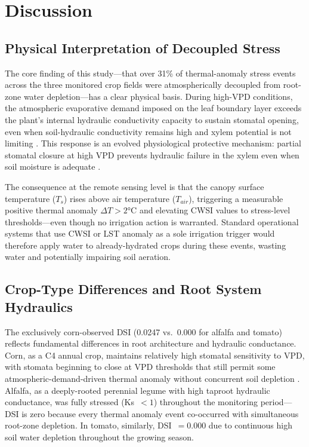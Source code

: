 \documentclass[review,12pt]{elsarticle}
\begin{document}
\section{Discussion}
\label{sec:discussion}

\subsection{Physical Interpretation of Decoupled Stress}
\label{subsec:physical_discussion}

The core finding of this study---that over 31\% of thermal-anomaly stress events across the three monitored crop fields were atmospherically decoupled from root-zone water depletion---has a clear physical basis. During high-VPD conditions, the atmospheric evaporative demand imposed on the leaf boundary layer exceeds the plant's internal hydraulic conductivity capacity to sustain stomatal opening, even when soil-hydraulic conductivity remains high and xylem potential is not limiting \citep{saliendra1995influence}. This response is an evolved physiological protective mechanism: partial stomatal closure at high VPD prevents hydraulic failure in the xylem even when soil moisture is adequate \citep{katul2012evapotranspiration}.

The consequence at the remote sensing level is that the canopy surface temperature ($T_s$) rises above air temperature ($T_{air}$), triggering a measurable positive thermal anomaly $\Delta T > 2$°C and elevating CWSI values \citep{idso1981normalizing, bellvert2016airborne, gonzalez2012thermal} to stress-level thresholds---even though no irrigation action is warranted. Standard operational systems that use CWSI or LST anomaly as a sole irrigation trigger would therefore apply water to already-hydrated crops during these events, wasting water and potentially impairing soil aeration.

\subsection{Crop-Type Differences and Root System Hydraulics}
\label{subsec:croptype_discussion}

The exclusively corn-observed DSI (0.0247 vs.~0.000 for alfalfa and tomato) reflects fundamental differences in root architecture and hydraulic conductance. Corn, as a C4 annual crop, maintains relatively high stomatal sensitivity to VPD, with stomata beginning to close at VPD thresholds that still permit some atmospheric-demand-driven thermal anomaly without concurrent soil depletion \citep{fereres2007deficit}. Alfalfa, as a deeply-rooted perennial legume with high taproot hydraulic conductance, was fully stressed (Ks~$<1$) throughout the monitoring period---DSI is zero because every thermal anomaly event co-occurred with simultaneous root-zone depletion. In tomato, similarly, DSI~$= 0.000$ due to continuous high soil water depletion throughout the growing season.
\end{document}
